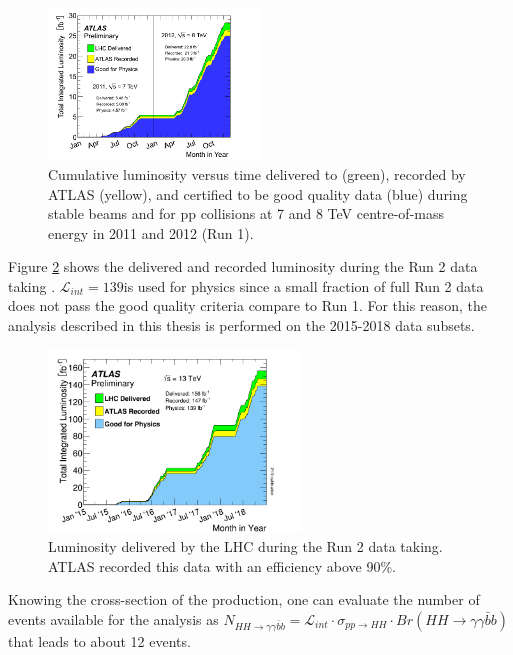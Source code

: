 \begin{figure}[htbp]
    \centering
    \includegraphics[width=0.5\textwidth]{Ch2/Img/LumiRun1.png}
    \caption{Cumulative luminosity versus time delivered to (green), recorded by ATLAS (yellow), and certified to be good quality data (blue) during stable beams and for pp collisions at 7 and 8 TeV centre-of-mass energy in 2011 and 2012 (Run 1).}
    \label{fig:chap2:LHC:Lumi:Run1}
\end{figure}
Figure \ref{fig:chap2:LHC:Lumi} shows the delivered and recorded luminosity during the Run 2 data taking \cite{Lumi2018}. $\mathcal{L}_{int} = 139$\ifb is used for physics since a small fraction of full Run 2 data does not pass the good quality criteria compare to Run 1. For this reason, the analysis described in this thesis is performed on the 2015-2018 data subsets.\\
\begin{figure}[htbp]
    \centering
    \includegraphics[width=0.6\textwidth]{Ch2/Img/Lumi.png}
    \caption{Luminosity delivered by the LHC during the Run 2 data taking. ATLAS recorded this data with an efficiency above 90\%.}
    \label{fig:chap2:LHC:Lumi}
\end{figure}
Knowing the cross-section of the \HHyybb production, one can evaluate the number of events available for the analysis as $N_{HH\rightarrow\gamma\gamma\bar{b}b} = \mathcal{L}_{int}\cdot\sigma_{pp\rightarrow HH}\cdot Br(HH\rightarrow\gamma\gamma\bar{b}b)$ that leads to about 12 events.

